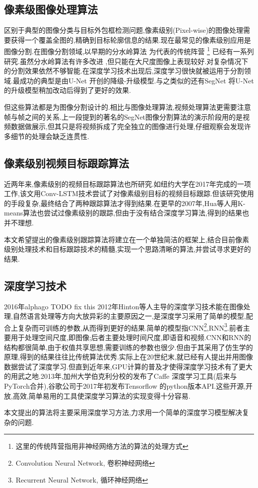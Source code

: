 \subsection{像素级图像处理算法}
区别于典型的图像分类与目标外包框检测问题,像素级别(Pixel-wise)的图像处理需要获得一个覆盖全图的,精确到目标轮廓信息的结果.现在最常见的像素级别应用是图像分割.在图像分割领域,以早期的分水岭算法
\supercite{olsen1997multi}
为代表的传统阵营
\footnote{这里的传统阵营指用非神经网络方法的算法的处理方式}
已经有一系列研究.虽然分水岭算法有许多改进
\supercite{grau2004improved}
,但只能在大尺度图像上表现较好.对复杂情况下的分割效果依然不够智能.在深度学习技术出现后,深度学习很快就被运用于分割领域.最成功的典型是由U-Net
\supercite{ronneberger2015u}
开创的降级-升级模型.与之类似的还有SegNet
\supercite{badrinarayanan2017segnet}
将U-Net的升级模型稍加改动后得到了更好的效果.
\par
但这些算法都是为图像分割设计的.相比与图像处理算法,视频处理算法更需要注意帧与帧之间的关系.上一段提到的著名的SegNet图像分割算法的演示阶段用的是视频数据做展示,但其只是将视频拆成了完全独立的图像进行处理,仔细观察会发现许多细节的处理会缺乏连贯性.

\subsection{像素级别视频目标跟踪算法}
近两年来,像素级别的视频目标跟踪算法也所研究.如纽约大学在2017年完成的一项工作\supercite{DBLP:journals/corr/abs-1711-07377},该文用Conv-LSTM技术\supercite{PatrauceanHC16}尝试了对像素级别目标的视频目标跟踪.但该研究使用的手段复杂,最终结合了两种跟踪算法才得到结果.在更早的2007年,Hua等人用K-means算法也尝试过像素级别的跟踪\supercite{hua2008k},但由于没有结合深度学习算法,得到的结果也并不理想.
\par
本文希望提出的像素级别跟踪算法将建立在一个单独简洁的框架上,结合目前像素级别处理技术和目标跟踪技术的精髓,实现一个思路清晰的算法,并尝试寻求更好的结果.

\subsection{深度学习技术}
2016年alphago\supercite{wang2016does} TODO fix this
2012年Hinton等人主导的深度学习技术能在图像处理,自然语言处理等方向大放异彩的主要原因之一,是深度学习采用了简单的模型,配合上复杂而可训练的参数,从而得到更好的结果.简单的模型指CNN\footnote{Convolution Neural Network, 卷积神经网络},RNN\footnote{Recurrent Neural Network, 循环神经网络}.前者主要用于处理空间尺度,即图像;后者主要处理时间尺度,即语音和视频.CNN和RNN的结构都很简单,由于权值共享思想,需要训练的参数也很少.但由于其采用了仿生学的原理,得到的结果往往比传统算法优秀.实际上在20世纪末,就已经有人提出并用图像数据尝试了深度学习\supercite{lecun1998gradient}.但直到近年来,GPU计算的普及才使得深度学习技术有了更大的用武之地.2013年,加州大学伯克利分校的发布了Caffe
\supercite{jia2014caffe}深度学习工具(后来与PyTorch\supercite{paszke2017automatic}合并),谷歌公司于2017年初发布Tensorflow
\supercite{abadi2016tensorflow}的python版本API.这些开源,开放,高效,简单易用的工具使深度学习算法的实现变得十分容易.
\par
本文提出的算法将主要采用深度学习方法,力求用一个简单的深度学习模型解决复杂的问题.

